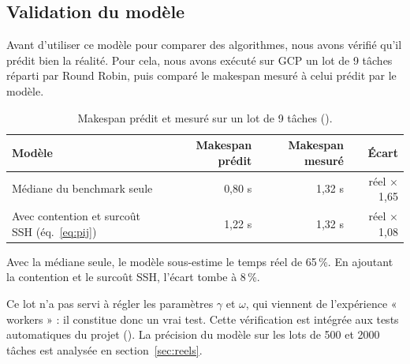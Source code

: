 \subsection{Validation du modèle}

Avant d'utiliser ce modèle pour comparer des algorithmes, nous avons vérifié
qu'il prédit bien la réalité. Pour cela, nous avons exécuté sur GCP un lot de
9 tâches réparti par Round Robin, puis comparé le makespan mesuré à celui prédit
par le modèle.

\begin{table}[H]
\centering\small
\begin{tabular}{lrrr}
\toprule
\textbf{Modèle} & \textbf{Makespan prédit} & \textbf{Makespan mesuré} & \textbf{Écart} \\
\midrule
Médiane du benchmark seule                             & 0,80 s & 1,32 s & réel $\times$ 1,65 \\
Avec contention et surcoût SSH (éq.~\ref{eq:pij})      & 1,22 s & 1,32 s & réel $\times$ 1,08 \\
\bottomrule
\end{tabular}
\caption{Makespan prédit et mesuré sur un lot de 9 tâches (\mesure{}).}
\label{tab:validation}
\end{table}

Avec la médiane seule, le modèle sous-estime le temps réel de 65\,\%. En
ajoutant la contention et le surcoût SSH, l'écart tombe à 8\,\%.

Ce lot n'a pas servi à régler les paramètres $\gamma$ et $\omega$, qui viennent
de l'expérience « workers » : il constitue donc un vrai test. Cette vérification
est intégrée aux tests automatiques du projet
(). La précision du modèle sur les lots de
500 et 2000 tâches est analysée en section~\ref{sec:reels}.

